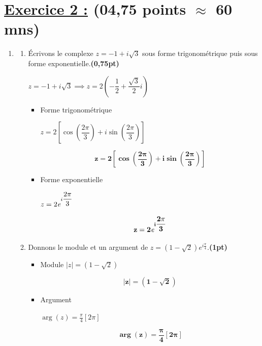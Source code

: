 \documentclass[12pt,a4paper]{article}
\begin{document}
\section*{\underline{Exercice 2 :} (04,75 points $\approx$ 60 mns)}
\begin{enumerate}
    \item 
    \begin{enumerate}
        \item Écrivons le complexe $z = -1 + i\sqrt{3}$ sous forme trigonométrique puis sous forme exponentielle.\hfill \textbf{(0,75pt)}

$z = -1 + i\sqrt{3}\implies z = 2\left( -\dfrac{1}{2} + \dfrac{\sqrt{3}}{2} i \right) $

\begin{itemize}
\item Forme trigonométrique

$z = 2\left[ \cos \left(\dfrac{2\pi}{3}\right) + i\sin \left(\dfrac{2\pi}{3}\right) \right]$
\begin{resultbox}
    \[
    \mathbf{ z = 2\left[ \cos \left(\dfrac{2\pi}{3}\right) + i\sin \left(\dfrac{2\pi}{3}\right) \right] }
    \]
\end{resultbox}

\item Forme exponentielle

$z = 2\emph{e}^{i\dfrac{2\pi}{3}}$
\begin{resultbox}
    \[
    \mathbf{ z = 2\emph{e}^{i\dfrac{2\pi}{3}} }
    \]
\end{resultbox}
\end{itemize}        
        
        \item Donnons le module et un argument de $z = (1 - \sqrt{2})e^{i\frac{\pi}{4}}$.\hfill \textbf{(1pt)}



\begin{itemize}
\item Module
$|z| = (1 - \sqrt{2})$
\begin{resultbox}
    \[
    \mathbf{ |z| = (1 - \sqrt{2}) }
    \]
\end{resultbox}


\item Argument

$\arg(z) = \frac{\pi}{4}[2\pi]$

\begin{resultbox}
    \[
    \mathbf{ \arg(z) = \frac{\pi}{4}[2\pi] }
    \]
\end{resultbox}


\end{itemize}
\end{enumerate}
\end{enumerate}
\end{document}
